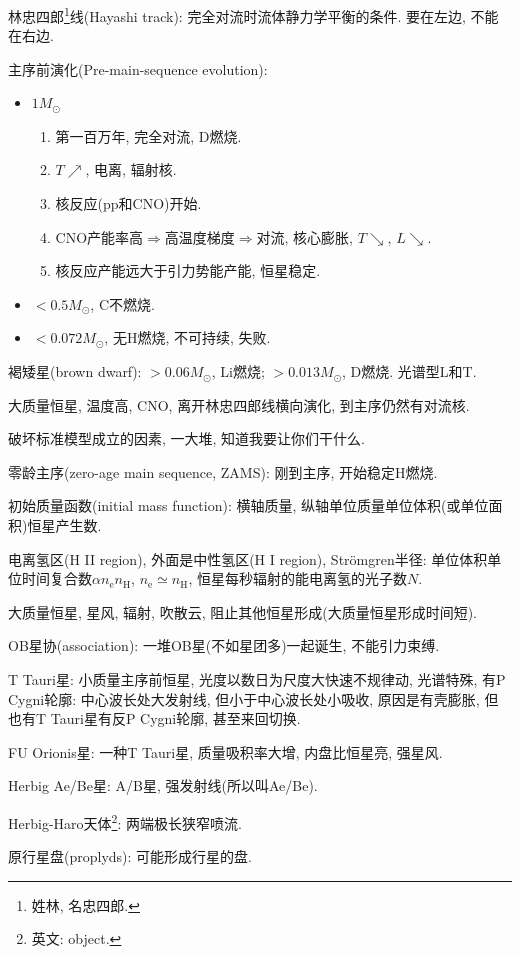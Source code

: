 林忠四郎\footnote{姓林, 名忠四郎.}线(Hayashi track): 完全对流时流体静力学平衡的条件.
要在左边, 不能在右边.

主序前演化(Pre-main-sequence evolution):
\begin{itemize}
    \item $1M_\odot$\begin{enumerate}
        \item 第一百万年, 完全对流, D燃烧.
        \item $T\nearrow$, 电离, 辐射核.
        \item 核反应(pp和CNO)开始.
        \item CNO产能率高$\Longrightarrow$高温度梯度$\Longrightarrow$对流, 核心膨胀, $T\searrow$, $L\searrow$.
        \item 核反应产能远大于引力势能产能, 恒星稳定.
    \end{enumerate}
    \item $<0.5M_\odot$, C不燃烧.
    \item $<0.072M_\odot$, 无H燃烧, 不可持续, 失败.
\end{itemize}
褐矮星(brown dwarf): $>0.06M_\odot$, Li燃烧; $>0.013M_\odot$, D燃烧. 光谱型L和T.

大质量恒星, 温度高, CNO, 离开林忠四郎线横向演化, 到主序仍然有对流核.

破坏标准模型成立的因素, 一大堆, 知道我要让你们干什么.

零龄主序(zero-age main sequence, ZAMS): 刚到主序, 开始稳定H燃烧.

初始质量函数(initial mass function): 横轴质量, 纵轴单位质量单位体积(或单位面积)恒星产生数.

电离氢区(H II region), 外面是中性氢区(H I region), Str\"omgren半径: 单位体积单位时间复合数$\alpha n_\text{e}n_\text{H}$, $n_\text{e}\simeq n_\text{H}$, 恒星每秒辐射的能电离氢的光子数$N$.

大质量恒星, 星风, 辐射, 吹散云, 阻止其他恒星形成(大质量恒星形成时间短).

OB星协(association): 一堆OB星(不如星团多)一起诞生, 不能引力束缚.

T Tauri星: 小质量主序前恒星, 光度以数日为尺度大快速不规律动, 光谱特殊, 有P Cygni轮廓: 中心波长处大发射线, 但小于中心波长处小吸收, 原因是有壳膨胀, 但也有T Tauri星有反P Cygni轮廓, 甚至来回切换.

FU Orionis星: 一种T Tauri星, 质量吸积率大增, 内盘比恒星亮, 强星风.

Herbig Ae/Be星: A/B星, 强发射线(所以叫Ae/Be).

Herbig-Haro天体\footnote{英文: object.}: 两端极长狭窄喷流. 

原行星盘(proplyds): 可能形成行星的盘.
